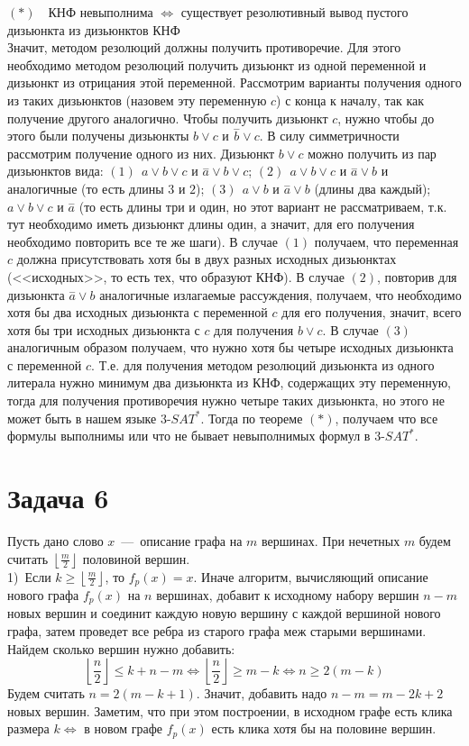 \documentclass[a4paper,12pt]{article} %
\begin{document}
\noindent $(*)$~~КНФ невыполнима $\Leftrightarrow$ существует резолютивный вывод пустого дизьюнкта из дизьюнктов КНФ\\
 
Значит, методом резолюций должны получить противоречие. Для этого необходимо методом резолюций получить дизьюнкт из одной переменной и дизьюнкт из отрицания этой переменной. Рассмотрим варианты получения одного из таких дизьюнктов (назовем эту переменную $c$) с конца к началу, так как получение другого аналогично. Чтобы получить дизьюнкт $c$, нужно чтобы до этого были получены дизьюнкты $b\vee c$ и $\overset{-}b\vee c$. В силу симметричности рассмотрим получение одного из них. Дизьюнкт $b\vee c$ можно получить из пар дизьюнктов вида: $(1)~~a\vee b\vee c$ и $\overset{-}a\vee b\vee c$; $(2)~~a\vee b\vee c$ и $\overset{-}a\vee b$ и аналогичные (то есть длины $3$ и $2$); $(3)~~a \vee b$ и $\overset{-}a \vee b$ (длины два каждый); $a\vee b\vee c$ и $\overset{-}a$ (то есть длины три и один, но этот вариант не рассматриваем, т.к. тут необходимо иметь дизьюнкт длины один, а значит, для его получения необходимо повторить все те же шаги). В случае $(1)$ получаем, что переменная $c$ должна присутствовать хотя бы в двух разных исходных дизьюнктах (<<исходных>>, то есть тех, что образуют КНФ). В случае $(2)$, повторив для дизьюнкта $\overset{-}a\vee b$ аналогичные излагаемые рассуждения, получаем, что необходимо хотя бы два исходных дизьюнкта с переменной $c$ для его получения, значит, всего хотя бы три исходных дизьюнкта с $c$ для получения $b\vee c$. В случае $(3)$ аналогичным образом получаем, что нужно хотя бы четыре исходных дизьюнкта с переменной $c$. Т.е. для получения методом резолюций дизьюнкта из одного литерала нужно минимум два дизьюнкта из КНФ, содержащих эту переменную, тогда для получения противоречия нужно четыре таких дизьюнкта, но этого не может быть в нашем языке $3$-$SAT^*$. Тогда по теореме $(*)$, получаем что все формулы выполнимы или что не бывает невыполнимых формул в $3$-$SAT^*$.\\

\section*{Задача 6}
Пусть дано слово $x$~---~описание графа на $m$ вершинах. При нечетных $m$ будем считать $\left\lfloor\frac{m}{2}\right\rfloor$ половиной вершин.\\
1)~Если $k \geq \left\lfloor\frac{m}{2}\right\rfloor$, то $f_p(x) = x$. Иначе алгоритм, вычисляющий описание нового графа $f_p(x)$ на $n$ вершинах, добавит к исходному набору вершин $n-m$ новых вершин и соединит каждую новую вершину с каждой вершиной нового графа, затем проведет все ребра из старого графа меж старыми вершинами. Найдем сколько вершин нужно добавить:\\
\[
\left\lfloor\frac{n}{2}\right\rfloor \leq k+n-m \Leftrightarrow \left\lfloor\frac{n}{2}\right\rfloor \geq m-k \Leftrightarrow n \geq 2(m-k)
\]
Будем считать $n = 2(m-k+1)$. Значит, добавить надо $n-m = m- 2k +2$ новых вершин. Заметим, что при этом построении, в исходном графе есть клика размера $k \Leftrightarrow$ в новом графе $f_p(x)$ есть клика хотя бы на половине вершин.\\
\end{document}
